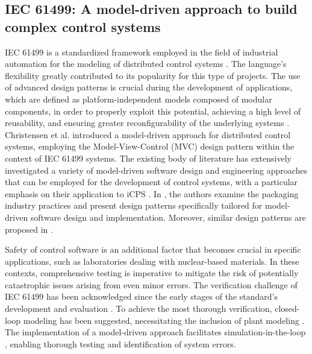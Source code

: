 \begin{bibunit}
\subsection{IEC 61499: A model-driven approach to build complex control systems}
IEC 61499 \cite{iec61499} is a standardized framework employed in the field of industrial automation for the modeling of distributed control systems \cite{drozdov2021}. The language's flexibility greatly contributed to its popularity for this type of projects. 
The use of advanced design patterns is crucial during the development of applications, which are defined as platform-independent models composed of modular components, in order to properly exploit this potential, achieving a high level of reusability, and ensuring greater reconfigurability of the underlying systems \cite{sonnleithner2021iec}.
Christensen et al. \cite{christensen2000design} introduced a model-driven approach for distributed control systems, employing the Model-View-Control (MVC) design pattern \cite{Model-view-controller} within the context of IEC 61499 systems. 
The existing body of literature has extensively investigated a variety of model-driven software design and engineering approaches that can be employed for the development of control systems, with a particular emphasis on their application to iCPS \cite{sandeep2018}.
In \cite{bonfe2013design}, the authors examine the packaging industry practices and present design patterns specifically tailored for model-driven software design and implementation. Moreover, similar design patterns are proposed in \cite{cengic2006framework, vyatkin2005architecture, hametner2010automation}.

Safety of control software is an additional factor that becomes crucial in specific applications, such as laboratories dealing with nuclear-based materials.
In these contexts, comprehensive testing is imperative to mitigate the risk of potentially catastrophic issues arising from even minor errors. 
The verification challenge of IEC 61499 has been acknowledged since the early stages of the standard's development and evaluation \cite{vyatkin1999modeling,hanisch2009one}. To achieve the most thorough verification, closed-loop modeling has been suggested, necessitating the inclusion of plant modeling \cite{vyatkin2008closed}. The implementation of a model-driven approach facilitates simulation-in-the-loop \cite{hegny2010iec, yang2012transformation}, enabling thorough testing and identification of system errors. 


\end{bibunit}

